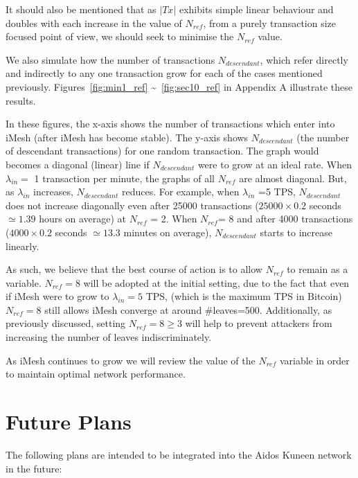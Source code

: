 \documentclass[a4paper,10pt,twocolumn]{article}
\begin{document}
	It should also be mentioned that as \(|Tx|\) exhibits simple linear behaviour and doubles with each increase in the value of \( N_{ref} \), from a purely transaction size focused point of view, we should seek 
	to minimise the \( N_{ref} \) value.
	
	We also simulate how the number of transactions \( N_{descendant} \), which refer directly and indirectly to any one transaction grow 
	 for each of the cases mentioned previously. Figures~\ref{fig:min1_ref} \textasciitilde~\ref{fig:sec10_ref} in Appendix A illustrate these results.
	 
	 In these figures, the x-axis shows the number of transactions which enter into iMesh (after iMesh has become stable). The y-axis shows \( N_{descendant} \) 
	 (the number of descendant transactions) for one random transaction. The graph would becomes a diagonal (linear) line if \( N_{descendant} \) were to grow at an ideal rate.
	 When \( \lambda_{in}=\) 1 transaction per minute, the graphs of all \( N_{ref}\) are almost diagonal.
	 But, as \( \lambda_{in}\) increases,  \( N_{descendant} \) reduces.
	 For example, when \( \lambda_{in}\) =5 TPS, \( N_{descendant} \) 
	 does not increase diagonally even after  25000 transactions (\( 25000 \times 0.2\) seconds \(\simeq 1.39 \) hours on average) at \( N_{ref} \) = 2.
When \( N_{ref}\)= 8 and after 4000 transactions (\( 4000 \times 0.2\) seconds \(\simeq 13.3 \) minutes on average),
 \( N_{descendant}\) starts to increase linearly.

	 As such, we believe that the best course of action is to allow \( N_{ref}\) to remain as a variable. \( N_{ref}=8\) will be adopted at the initial setting, due to the fact that 
	 even if iMesh were to grow to \( \lambda_{in}=5\) TPS, (which is the maximum TPS
	 in Bitcoin) \( N_{ref}=8\) still allows iMesh converge at around \#leaves=500. 
	 Additionally, as previously discussed, setting \( N_{ref}=8 \geq 3\) will
	 help to prevent attackers from increasing the number of leaves indiscriminately.
	
 	 As iMesh continues to grow we will review the value of the \( N_{ref}\) variable in order to maintain optimal network performance.
 	 
\section{Future Plans}
\label{sec:future plans}

	The following plans are intended to be integrated into the Aidos Kuneen network in the future:
	 
\end{document}
